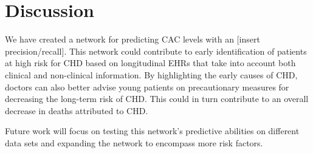 \section{Discussion}

We have created a network for predicting CAC levels with an [insert precision/recall]. This network could contribute to early identification of patients at high risk for CHD based on longitudinal EHRs that take into account both clinical and non-clinical information. By highlighting the early causes of CHD, doctors can also better advise young patients on precautionary measures for decreasing the long-term risk of CHD. This could in turn contribute to an overall decrease in deaths attributed to CHD.

Future work will focus on testing this network's predictive abilities on different data sets and expanding the network to encompass more risk factors. 

\begin{comment}
With our findings we can contribute accurate medical predictions that reveal the probability of cardiovascular issues happening later on in a patients life.  Given this knowledge we can aid the medical field in producing treatments that take a more patient-specific approach than before.  Enabling doctors to take precautionary measures earlier in a patients life to prevent cardiovascular problems such as Coronary Heart Disease (CHD) or more specifically Myocardial Infarction (MI) from occurring. Which can ultimately assist in reducing the substantial amount of Americans who suffer from Coronary Heart Disease. 
\end{comment}
